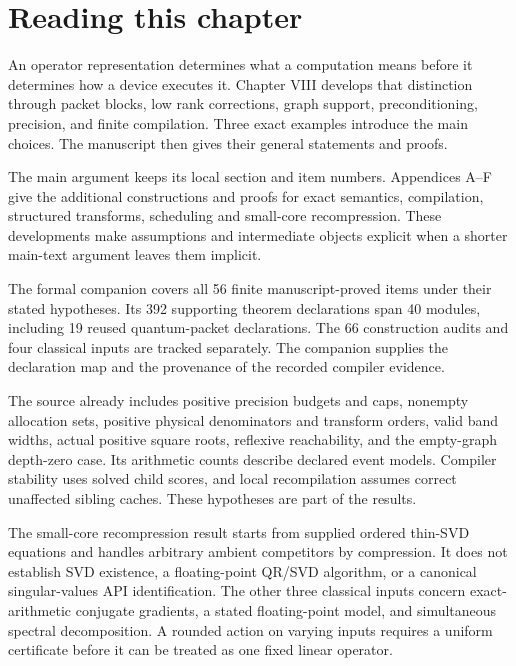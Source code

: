 \documentclass[11pt,letterpaper]{article}
\theoremstyle{definition}
\theoremstyle{remark}
\begin{document}
\KomorebiCover
{}

\section*{Reading this chapter}
An operator representation determines what a computation means before it determines how a device executes it. Chapter VIII develops that distinction through packet blocks, low rank corrections, graph support, preconditioning, precision, and finite compilation. Three exact examples introduce the main choices. The manuscript then gives their general statements and proofs.

The main argument keeps its local section and item numbers. Appendices A--F give the additional constructions and proofs for exact semantics, compilation, structured transforms, scheduling and small-core recompression. These developments make assumptions and intermediate objects explicit when a shorter main-text argument leaves them implicit.

The formal companion covers all 56 finite manuscript-proved items under their stated hypotheses. Its 392 supporting theorem declarations span 40 modules, including 19 reused quantum-packet declarations. The 66 construction audits and four classical inputs are tracked separately. The companion supplies the declaration map and the provenance of the recorded compiler evidence.

The source already includes positive precision budgets and caps, nonempty allocation sets, positive physical denominators and transform orders, valid band widths, actual positive square roots, reflexive reachability, and the empty-graph depth-zero case. Its arithmetic counts describe declared event models. Compiler stability uses solved child scores, and local recompilation assumes correct unaffected sibling caches. These hypotheses are part of the results.

The small-core recompression result starts from supplied ordered thin-SVD equations and handles arbitrary ambient competitors by compression. It does not establish SVD existence, a floating-point QR/SVD algorithm, or a canonical singular-values API identification. The other three classical inputs concern exact-arithmetic conjugate gradients, a stated floating-point model, and simultaneous spectral decomposition. A rounded action on varying inputs requires a uniform certificate before it can be treated as one fixed linear operator.
\end{document}
